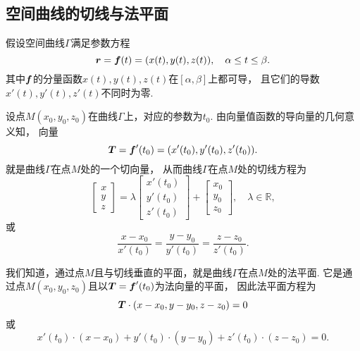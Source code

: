 \subsection{空间曲线的切线与法平面}
假设空间曲线\(\Gamma\)满足参数方程 
\[
	\boldsymbol{r}
	= \boldsymbol{f}(t)
	= (x(t),y(t),z(t)),
	\quad \alpha \leq t \leq \beta.
\]
其中\(\boldsymbol{f}\)的分量函数\(x(t),y(t),z(t)\)在\([\alpha,\beta]\)上都可导，
且它们的导数\(x'(t),y'(t),z'(t)\)不同时为零.

设点\(M(x_0,y_0,z_0)\)在曲线\(\Gamma\)上，对应的参数为\(t_0\).
由向量值函数的导向量的几何意义知，
向量\begin{equation}
	\boldsymbol{T}
	= \boldsymbol{f}'(t_0)
	= (x'(t_0),y'(t_0),z'(t_0)).
\end{equation}
就是曲线\(\Gamma\)在点\(M\)处的一个切向量，
从而曲线\(\Gamma\)在点\(M\)处的切线方程为
\begin{equation}
	\begin{bmatrix}
		x \\
		y \\
		z
	\end{bmatrix}
	= \lambda \begin{bmatrix}
		x'(t_0) \\
		y'(t_0) \\
		z'(t_0)
	\end{bmatrix}
	+ \begin{bmatrix}
		x_0 \\
		y_0 \\
		z_0
	\end{bmatrix},
	\quad \lambda\in\mathbb{R},
\end{equation}
或
\begin{equation}\label{equation:多元函数微分学的几何应用.曲线的切线方程}
	\frac{x-x_0}{x'(t_0)}
	=\frac{y-y_0}{y'(t_0)}
	=\frac{z-z_0}{z'(t_0)}.
\end{equation}

我们知道，通过点\(M\)且与切线垂直的平面，就是曲线\(\Gamma\)在点\(M\)处的法平面.
它是通过点\(M(x_0,y_0,z_0)\)且以\(\boldsymbol{T}=\boldsymbol{f}'(t_0)\)为法向量的平面，
因此法平面方程为\begin{equation}
	\boldsymbol{T}\cdot(x-x_0,y-y_0,z-z_0)=0
\end{equation}
或\begin{equation}
	x'(t_0) \cdot (x-x_0) + y'(t_0) \cdot (y-y_0) + z'(t_0) \cdot (z-z_0) = 0.
\end{equation}

